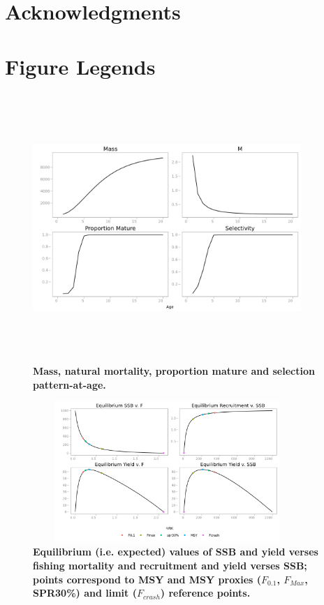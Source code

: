 \documentclass[10pt]{article}
\begin{document}
\section*{Acknowledgments}


\newpage
 

%

\section*{Figure Legends}

\begin{figure}[!ht]
\begin{center}
\includegraphics[height=4in, width=4in]{fig1.png}
\end{center}
\caption{\bf{Mass, natural mortality, proportion mature and selection pattern-at-age.}}
\label{Figure_label_1}
\end{figure}

\begin{figure}[!ht]
\begin{center}
\includegraphics[height=2.1in, width=4in]{fig2.png}
\end{center}
\caption{\bf{Equilibrium (i.e. expected) values of SSB and yield verses fishing mortality and recruitment and yield verses SSB; points correspond to
MSY and MSY proxies ($F_{0.1}$, $F_{Max}$, SPR30\%) and limit ($F_{crash}$) reference points.}}
\label{Figure_label_2}
\end{figure}
\end{document}
